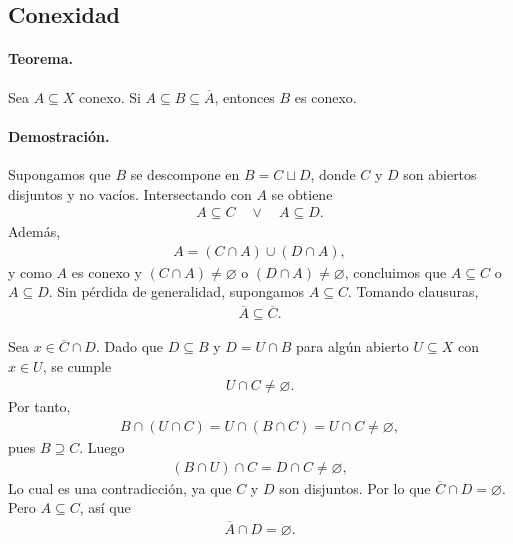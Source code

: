 
\subsection{Conexidad}

\paragraph{\textbf{Teorema.}}
Sea $A\subseteq X$ conexo.  
Si $A\subseteq B \subseteq \overline{A}$, entonces $B$ es conexo.

\paragraph{\textbf{Demostración.}}
Supongamos que $B$ se descompone en $B=C\sqcup D$, donde $C$ y $D$ son abiertos disjuntos y no vacíos.  
Intersectando con $A$ se obtiene
\begin{align*}
A\subseteq C \quad \lor \quad A\subseteq D .
\end{align*}
Además,
\begin{align*}
A=(C\cap A)\cup(D\cap A),
\end{align*}
y como $A$ es conexo y $(C\cap A)\neq\varnothing$ o $(D\cap A)\neq\varnothing$, concluimos que $A\subseteq C$ o $A\subseteq D$.  
Sin pérdida de generalidad, supongamos $A\subseteq C$.  
Tomando clausuras,
\begin{align*}
\overline{A}\subseteq\overline{C}.
\end{align*}

Sea $x\in\overline{C}\cap D$.  
Dado que $D\subseteq B$ y $D=U\cap B$ para algún abierto $U\subseteq X$ con $x\in U$, se cumple
\begin{align*}
U\cap C\neq\varnothing .
\end{align*}
Por tanto,
\begin{align*}
B\cap(U\cap C)=U\cap(B\cap C)=U\cap C\neq\varnothing ,
\end{align*}
pues $B\supseteq C$. Luego
\begin{align*}
(B\cap U)\cap C=D\cap C\neq\varnothing ,
\end{align*}
Lo cual es una contradicción, ya que $C$ y $D$ son disjuntos. Por lo que $\overline{C}\cap D=\varnothing$. Pero $A\subseteq C$, así que
\begin{align*}
\overline{A}\cap D = \varnothing .
\end{align*}

